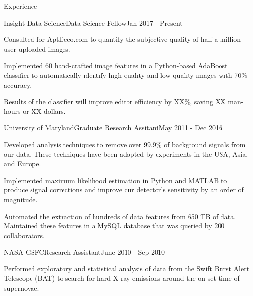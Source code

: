 \documentclass{resume} %
\begin{document}
\begin{rSection}{Experience}

\begin{rSubsection}{Insight Data Science}{Data Science Fellow}{Jan 2017 - Present}{}{ }
\item Consulted for AptDeco.com to quantify the subjective quality of half a million user-uploaded images.
\item Implemented 60 hand-crafted image features in a Python-based AdaBoost classifier to automatically identify high-quality and low-quality images with 70\% accuracy.
\item Results of the classifier will improve editor efficiency by XX\%, saving XX man-hours or XX-dollars.
\end{rSubsection}


\begin{rSubsection}{University of Maryland}{Graduate Research Assitant}{May 2011 - Dec 2016}{}{ }

\item Developed analysis techniques to remove over 99.9\% of background signals from our data. These techniques have been adopted by experiments in the USA, Asia, and Europe.
\item Implemented maximum likelihood estimation in Python and MATLAB to produce signal corrections and improve our detector's sensitivity by an order of magnitude.
\item Automated the extraction of hundreds of data features from 650 TB of data.  Maintained these features in a MySQL database that was queried by 200 collaborators.


\end{rSubsection}


\begin{rSubsection}{NASA GSFC}{Research Assistant}{June 2010 - Sep 2010}{}{}
\item Performed exploratory and statistical analysis of data from the Swift Burst Alert Telescope (BAT) to search for hard X-ray emissions around the on-set time of supernovae.
\end{rSubsection}

\end{rSection}

\end{document}
